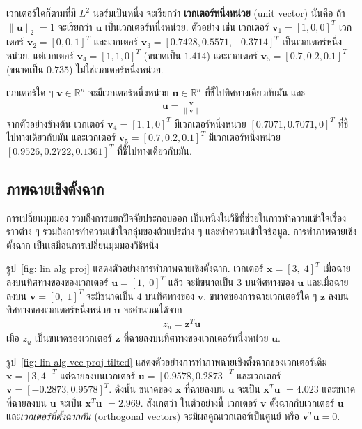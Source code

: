 เวกเตอร์ใดก็ตามที่มี $L^2$ นอร์มเป็นหนึ่ง จะเรียกว่า  
\textbf{เวกเตอร์หนึ่งหน่วย} (unit vector)
นั่นคือ ถ้า $\| \bm{u} \|_2 = 1$ จะเรียกว่า $\bm{u}$ เป็นเวกเตอร์หนึ่งหน่วย.
ตัวอย่าง เช่น 
เวกเตอร์ $\bm{v}_1 = [1, 0, 0]^T$
เวกเตอร์  $\bm{v}_2 = [0, 0, 1]^T$
และเวกเตอร์ $\bm{v}_3 = [0.7428,  0.5571, -0.3714]^T$
เป็นเวกเตอร์หนึ่งหน่วย.
แต่เวกเตอร์  $\bm{v}_4 = [1, 1, 0]^T$ (ขนาดเป็น $1.414$)
และเวกเตอร์ $\bm{v}_5 = [0.7, 0.2, 0.1]^T$ (ขนาดเป็น $0.735$)
ไม่ใช่เวกเตอร์หนึ่งหน่วย.

เวกเตอร์ใด ๆ $\bm{v} \in \mathbb{R}^n$ จะมีเวกเตอร์หนึ่งหน่วย $\bm{u} \in \mathbb{R}^n$ ที่ชี้ไปทิศทางเดียวกับมัน และ
\begin{eqnarray}
\bm{u} = \frac{\bm{v}}{\|\bm{v}\|}
\label{eq: linalg unit vec}
\end{eqnarray}
จากตัวอย่างข้างต้น
เวกเตอร์  $\bm{v}_4 = [1, 1, 0]^T$
มีีเวกเตอร์หนึ่งหน่วย $[ 0.7071, 0.7071, 
0]^T$ ที่ชี้ไปทางเดียวกับมัน 
และเวกเตอร์ $\bm{v}_5 = [0.7, 0.2, 0.1]^T$
มีีเวกเตอร์หนึ่งหน่วย
$[0.9526, 0.2722,  0.1361]^T$
ที่ชี้ไปทางเดียวกับมัน.

\subsection{ภาพฉายเชิงตั้งฉาก}
การเปลี่ยนมุมมอง
รวมถึงการแยกปัจจัยประกอบออก
เป็นหนึ่งในวิธีที่ช่วยในการทำความเข้าใจเรื่องราวต่าง ๆ รวมถึงการทำความเข้าใจกลุ่มของตัวแปรต่าง ๆ และทำความเข้าใจข้อมูล.
%
การทำภาพฉายเชิงตั้งฉาก เป็นเสมือนการเปลี่ยนมุมมองวิธีหนึ่ง

รูป~\ref{fig: lin alg proj} แสดงตัวอย่างการทำภาพฉายเชิงตั้งฉาก.
เวกเตอร์ $\bm{x} = [3, \; 4]^T$ เมื่อฉายลงบนทิศทางของของเวกเตอร์ $\bm{u} = [1, \; 0]^T$ แล้ว
จะมีขนาดเป็น $3$ บนทิศทางของ $\bm{u}$
และเมื่อฉายลงบน $\bm{v} = [0,\; 1]^T$
จะมีขนาดเป็น $4$
บนทิศทางของ $\bm{v}$.
ขนาดของการฉายเวกเตอร์ใด ๆ $\bm{z}$ ลงบนทิศทางของเวกเตอร์หนึ่งหน่วย $\bm{u}$ จะคำนวณได้จาก
\begin{eqnarray}
z_u = \bm{z}^T \bm{u}
\label{eq: linalg vector projection}
\end{eqnarray}
เมื่อ $z_u$ เป็นขนาดของเวกเตอร์ $\bm{z}$ ที่ฉายลงบนทิศทางของเวกเตอร์หนึ่งหน่วย $\bm{u}$.

%
รูป~\ref{fig: lin alg vec proj tilted} แสดงตัวอย่างการทำภาพฉายเชิงตั้งฉากของเวกเตอร์เดิม $\bm{x} = [3, 4]^T$ แต่ฉายลงบนเวกเตอร์
$\bm{u} =  [0.9578, 0.2873]^T$
และเวกเตอร์ $\bm{v} =  [-0.2873, 0.9578]^T$.
ดังนั้น ขนาดของ $\bm{x}$ ที่ฉายลงบน $\bm{u}$ จะเป็น $\bm{x}^T \bm{u}$
$=4.023$
และขนาดที่ฉายลงบน
$\bm{u}$ จะเป็น $\bm{x}^T \bm{u}$
$=2.969$.
%
สังเกตว่า
ในตัวอย่างนี้
เวกเตอร์ $\bm{v}$ ตั้งฉากกับเวกเตอร์ $\bm{u}$ 
และ\textit{เวกเตอร์ที่ตั้งฉากกัน} (orthogonal vectors) จะมีผลคูณเวกเตอร์เป็นศูนย์ หรือ $\bm{v}^T \bm{u} = 0$.


